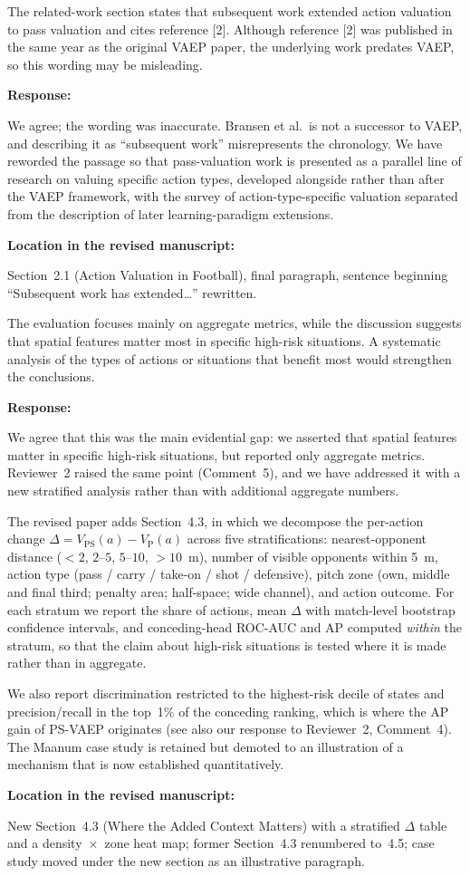 \documentclass[11pt,a4paper]{article}
\newcommand{\newwork}[1]{\textcolor{statusnew}{#1}}
\newcommand{\response}[2]{%
  \begin{responsebox}
  \textbf{Response:}

  #1
  \end{responsebox}
  \begin{locationbox}
  \textbf{Location in the revised manuscript:}

  #2
  \end{locationbox}
}
\begin{document}
\begin{reviewbox}[Comment 2]
The related-work section states that subsequent work extended action valuation to pass valuation and cites reference [2]. Although reference [2] was published in the same year as the original VAEP paper, the underlying work predates VAEP, so this wording may be misleading.
\end{reviewbox}
\response{We agree; the wording was inaccurate. Bransen et al.\ is not a successor to VAEP, and describing it as ``subsequent work'' misrepresents the chronology. We have reworded the passage so that pass-valuation work is presented as a parallel line of research on valuing specific action types, developed alongside rather than after the VAEP framework, with the survey of action-type-specific valuation separated from the description of later learning-paradigm extensions.}{Section~2.1 (Action Valuation in Football), final paragraph, sentence beginning ``Subsequent work has extended\ldots'' rewritten.}

\begin{reviewbox}[Comment 3]
The evaluation focuses mainly on aggregate metrics, while the discussion suggests that spatial features matter most in specific high-risk situations. A systematic analysis of the types of actions or situations that benefit most would strengthen the conclusions.
\end{reviewbox}
\response{We agree that this was the main evidential gap: we asserted that spatial features matter in specific high-risk situations, but reported only aggregate metrics. Reviewer~2 raised the same point (Comment~5), and we have addressed it with a new stratified analysis rather than with additional aggregate numbers.

\newwork{The revised paper adds Section~4.3, in which we decompose the per-action change $\Delta = V_{\mathrm{PS}}(a) - V_{\mathrm{P}}(a)$ across five stratifications: nearest-opponent distance ($<2$, $2$--$5$, $5$--$10$, $>10$~m), number of visible opponents within 5~m, action type (pass / carry / take-on / shot / defensive), pitch zone (own, middle and final third; penalty area; half-space; wide channel), and action outcome. For each stratum we report the share of actions, mean $\Delta$ with match-level bootstrap confidence intervals, and conceding-head ROC-AUC and AP computed \emph{within} the stratum, so that the claim about high-risk situations is tested where it is made rather than in aggregate.}

\newwork{We also report discrimination restricted to the highest-risk decile of states and precision/recall in the top~1\% of the conceding ranking, which is where the AP gain of PS-VAEP originates (see also our response to Reviewer~2, Comment~4). The Maanum case study is retained but demoted to an illustration of a mechanism that is now established quantitatively.}}{New Section~4.3 (Where the Added Context Matters) with a stratified $\Delta$ table and a density~$\times$~zone heat map; former Section~4.3 renumbered to~4.5; case study moved under the new section as an illustrative paragraph.}
\end{document}
